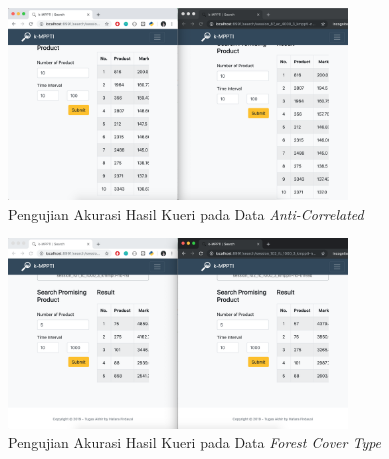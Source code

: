 \begin{figure}[H]
	\centering
	\includegraphics[width=9cm]{assets/img/bab5/pengujian-akurasi3.png}
	\caption{Pengujian Akurasi Hasil Kueri pada Data \textit{Anti-Correlated}}
	\label{fig:akurasi3}
\end{figure}

\begin{figure}[H]
	\centering
	\includegraphics[width=9cm]{assets/img/bab5/pengujian-akurasi2.png}
	\caption{Pengujian Akurasi Hasil Kueri pada Data \textit{Forest Cover Type}}
	\label{fig:akurasi2}
\end{figure}
